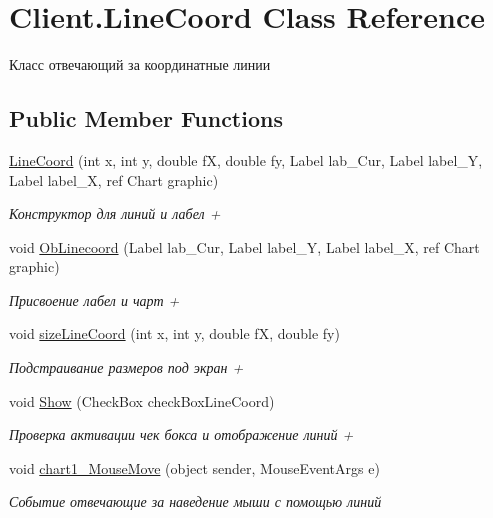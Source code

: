 \hypertarget{class_client_1_1_line_coord}{}\section{Client.\+Line\+Coord Class Reference}
\label{class_client_1_1_line_coord}


Класс отвечающий за координатные линии  


\subsection*{Public Member Functions}
\begin{DoxyCompactItemize}
\item 
\hyperlink{class_client_1_1_line_coord_a0cbce126477bfbcd61f7f717bdc0f5fd}{Line\+Coord} (int x, int y, double fX, double fy, Label lab\+\_\+\+Cur, Label label\+\_\+Y, Label label\+\_\+X, ref Chart graphic)
\begin{DoxyCompactList}\small\item\em Конструктор для линий и лабел + \end{DoxyCompactList}\item 
void \hyperlink{class_client_1_1_line_coord_a4009afb548e23a911cae4238935d8f07}{Ob\+Linecoord} (Label lab\+\_\+\+Cur, Label label\+\_\+Y, Label label\+\_\+X, ref Chart graphic)
\begin{DoxyCompactList}\small\item\em Присвоение лабел и чарт + \end{DoxyCompactList}\item 
void \hyperlink{class_client_1_1_line_coord_a5fdd32f8f5936850de0e1a0836914468}{size\+Line\+Coord} (int x, int y, double fX, double fy)
\begin{DoxyCompactList}\small\item\em Подстраивание размеров под экран + \end{DoxyCompactList}\item 
void \hyperlink{class_client_1_1_line_coord_a8092ccedc304ed8cecfb386016efe877}{Show} (Check\+Box check\+Box\+Line\+Coord)
\begin{DoxyCompactList}\small\item\em Проверка активации чек бокса и отображение линий + \end{DoxyCompactList}\item 
void \hyperlink{class_client_1_1_line_coord_a525dfa0064c415a6317312e7fcfae88f}{chart1\+\_\+\+Mouse\+Move} (object sender, Mouse\+Event\+Args e)
\begin{DoxyCompactList}\small\item\em Событие отвечающие за наведение мыши с помощью линий \end{DoxyCompactList}\end{DoxyCompactItemize}
